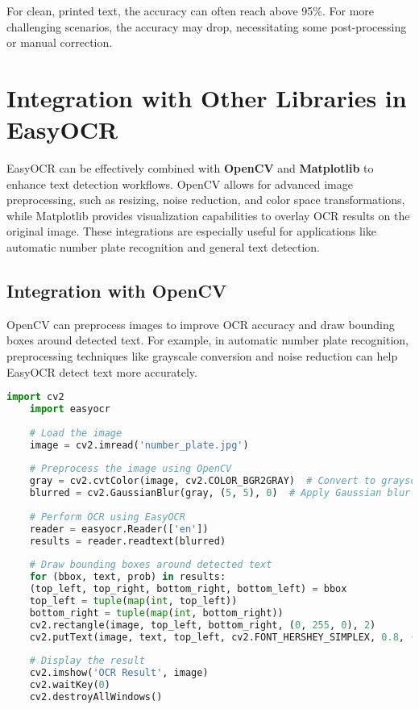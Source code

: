 For clean, printed text, the accuracy can often reach above 95\%. For more challenging scenarios, the accuracy may drop, necessitating some post-processing or manual correction.\cite{Glintecoeasyocr:2023}

\section{Integration with Other Libraries in EasyOCR}

EasyOCR can be effectively combined with \textbf{OpenCV} and \textbf{Matplotlib} to enhance text detection workflows. OpenCV allows for advanced image preprocessing, such as resizing, noise reduction, and color space transformations, while Matplotlib provides visualization capabilities to overlay OCR results on the original image. These integrations are especially useful for applications like automatic number plate recognition and general text detection.

\subsection{Integration with OpenCV}

OpenCV can preprocess images to improve OCR accuracy and draw bounding boxes around detected text. For example, in automatic number plate recognition, preprocessing techniques like grayscale conversion and noise reduction can help EasyOCR detect text more accurately.\cite{Augmentedstartupsanpr:2023} 

\begin{lstlisting}[language=Python, caption=Automatic Number Plate Recognition with EasyOCR and OpenCV]
	import cv2
	import easyocr
	
	# Load the image
	image = cv2.imread('number_plate.jpg')
	
	# Preprocess the image using OpenCV
	gray = cv2.cvtColor(image, cv2.COLOR_BGR2GRAY)  # Convert to grayscale
	blurred = cv2.GaussianBlur(gray, (5, 5), 0)  # Apply Gaussian blur
	
	# Perform OCR using EasyOCR
	reader = easyocr.Reader(['en'])
	results = reader.readtext(blurred)
	
	# Draw bounding boxes around detected text
	for (bbox, text, prob) in results:
	(top_left, top_right, bottom_right, bottom_left) = bbox
	top_left = tuple(map(int, top_left))
	bottom_right = tuple(map(int, bottom_right))
	cv2.rectangle(image, top_left, bottom_right, (0, 255, 0), 2)
	cv2.putText(image, text, top_left, cv2.FONT_HERSHEY_SIMPLEX, 0.8, (0, 255, 0), 2)
	
	# Display the result
	cv2.imshow('OCR Result', image)
	cv2.waitKey(0)
	cv2.destroyAllWindows()
\end{lstlisting}

